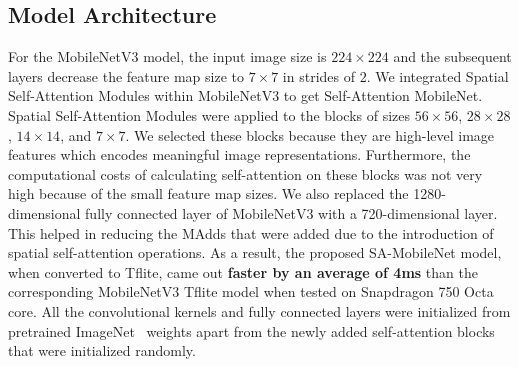 \documentclass{bmvc2k}
\begin{document}
\subsection{Model Architecture}
\label{sec:model}
For the MobileNetV3 model, the input image size is $224\times 224$ and the subsequent layers decrease the feature map size to $7\times 7$ in strides of $2$. We integrated Spatial Self-Attention Modules within MobileNetV3 to get Self-Attention MobileNet.
Spatial Self-Attention Modules were applied to the blocks of sizes $56\times 56$, $28\times 28$, $14\times 14$, and $7\times 7$. 
We selected these blocks because they are high-level image features which encodes meaningful image representations. Furthermore, the computational costs of calculating self-attention on these blocks was not very high because of the small feature map sizes.  
We also replaced the 1280-dimensional fully connected layer of MobileNetV3 with a 720-dimensional layer. This helped in reducing the MAdds that were added due to the introduction of spatial self-attention operations.
As a result, the proposed SA-MobileNet model, when converted to Tflite, came out {\bf faster by an average of 4ms} than the corresponding MobileNetV3 Tflite model when tested on Snapdragon 750 Octa core. All the convolutional kernels and fully connected layers were initialized from pretrained ImageNet~\cite{krizhevsky2012alexnet} weights apart from the newly added self-attention blocks that were initialized randomly.
\end{document}
